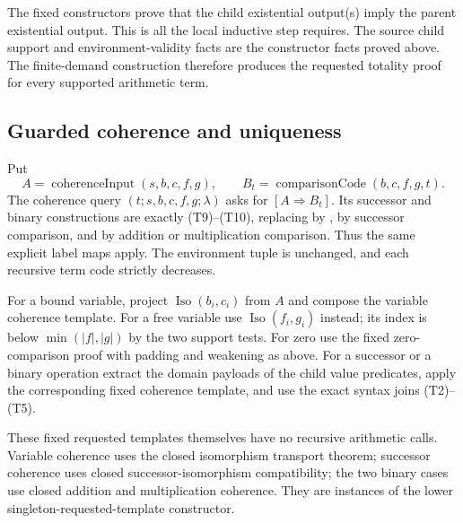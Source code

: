 The fixed constructors prove that the child existential output(s)
imply the parent existential output.  This is all the local inductive
step requires.  The source child support and environment-validity
facts are the constructor facts proved above.  The finite-demand
construction therefore produces the requested totality proof for
every supported arithmetic term.

\subsection{Guarded coherence and uniqueness}

Put
\[
 A=\operatorname{coherenceInput}(s,b,c,f,g),\qquad
 B_t=\operatorname{comparisonCode}(b,c,f,g,t).
\]
The coherence query $(t;s,b,c,f,g;\lambda)$ asks for
$[A\Rightarrow B_t]$.  Its successor and binary constructions are
exactly (T9)--(T10), replacing  by ,
 by successor comparison, and  by
addition or multiplication comparison.  Thus the same explicit label
maps apply.  The environment tuple is unchanged, and each recursive
term code strictly decreases.

For a bound variable, project
$\operatorname{Iso}(b_i,c_i)$ from $A$ and compose the variable
coherence template.  For a free variable use
$\operatorname{Iso}(f_i,g_i)$ instead; its index is below
$\min(|f|,|g|)$ by the two support tests.  For zero use the fixed
zero-comparison proof with padding and weakening as above.  For a
successor or a binary operation extract the domain payloads of the
child value predicates, apply the corresponding fixed coherence
template, and use the exact syntax joins (T2)--(T5).

These fixed requested templates themselves have no recursive arithmetic
calls.  Variable coherence uses the closed isomorphism transport
theorem; successor coherence uses closed successor-isomorphism
compatibility; the two binary cases use closed addition and
multiplication coherence.  They are instances of the lower
singleton-requested-template constructor.

